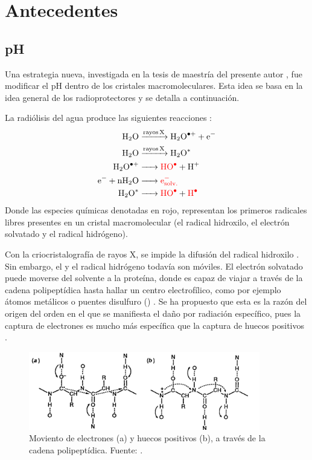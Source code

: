 \chapter{Antecedentes}
\section{pH}
Una estrategia nueva, investigada en la tesis de maestría del presente autor%
, fue modificar el pH dentro de los cristales macromoleculares. Esta idea se basa en la idea general de los radioprotectores y se detalla a continuación. 

La radiólisis del agua produce las siguientes reacciones :
\begin{align}
	\ce{H2O           &->[rayos X]     H2O^{.+}    +             e^{-}}  \\
	\ce{H2O           &->[rayos X]     H2O^{*}}                          \\
	\ce{H2O^{.+}      &->  \color{red}HO^{.}       +              H^{+}} \\
	\ce{e^{-} + nH2O  &->  \color{red}e^{-}_{solv.}}                     \\
	\ce{H2O^{*}       &->  \color{red}HO^{.}       +   \color{red}H^{.}}
\end{align} 
Donde las especies químicas denotadas en rojo, representan los primeros radicales libres presentes en un cristal macromolecular (el radical hidroxilo, el electrón solvatado y el radical hidrógeno).%

Con la criocristalografía de rayos X, se impide la difusión del radical hidroxilo . Sin embargo, el  y el radical hidrógeno todavía son móviles. El electrón solvatado puede moverse del solvente a la proteína, donde es capaz de viajar a través de la cadena polipeptídica hasta hallar un centro electrofílico, como por ejemplo átomos metálicos o puentes disulfuro () . Se ha propuesto que esta es la razón del origen del orden en el que se manifiesta el daño por radiación específico, pues la captura de electrones es mucho más específica que la captura de huecos positivos . 

\begin{figure}[h]
	\centering
	\includegraphics[width=0.9\textwidth]{imgs/symons92.png}
	\caption[Movimiento de cargas en la cadena polipeptídica]{Moviento de electrones (a) y huecos positivos (b), a través de la cadena polipeptídica. Fuente: \cite{Symons1997}.}
\end{figure}

